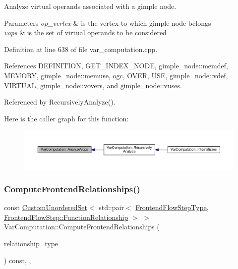 Analyze virtual operands associated with a gimple node. 


\begin{DoxyParams}{Parameters}
{\em op\+\_\+vertex} & is the vertex to which gimple node belongs \\
\hline
{\em vops} & is the set of virtual operands to be considered \\
\hline
\end{DoxyParams}


Definition at line 638 of file var\+\_\+computation.\+cpp.



References D\+E\+F\+I\+N\+I\+T\+I\+ON, G\+E\+T\+\_\+\+I\+N\+D\+E\+X\+\_\+\+N\+O\+DE, gimple\+\_\+node\+::memdef, M\+E\+M\+O\+RY, gimple\+\_\+node\+::memuse, ogc, O\+V\+ER, U\+SE, gimple\+\_\+node\+::vdef, V\+I\+R\+T\+U\+AL, gimple\+\_\+node\+::vovers, and gimple\+\_\+node\+::vuses.



Referenced by Recursively\+Analyze().

Here is the caller graph for this function\+:
\nopagebreak
\begin{figure}[H]
\begin{center}
\leavevmode
\includegraphics[width=350pt]{dd/d82/classVarComputation_ad1023a1abf7c16ada56d21c0385a54be_icgraph}
\end{center}
\end{figure}
\mbox{\label{classVarComputation_abbb72405583e939427e62d78175ac7e3}} 
\subsubsection{\texorpdfstring{Compute\+Frontend\+Relationships()}{ComputeFrontendRelationships()}}
{\footnotesize\ttfamily const \hyperlink{classCustomUnorderedSet}{Custom\+Unordered\+Set}$<$ std\+::pair$<$ \hyperlink{frontend__flow__step_8hpp_afeb3716c693d2b2e4ed3e6d04c3b63bb}{Frontend\+Flow\+Step\+Type}, \hyperlink{classFrontendFlowStep_af7cf30f2023e5b99e637dc2058289ab0}{Frontend\+Flow\+Step\+::\+Function\+Relationship} $>$ $>$ Var\+Computation\+::\+Compute\+Frontend\+Relationships (\begin{DoxyParamCaption}\item[{const \hyperlink{classDesignFlowStep_a723a3baf19ff2ceb77bc13e099d0b1b7}{Design\+Flow\+Step\+::\+Relationship\+Type}}]{relationship\+\_\+type }\end{DoxyParamCaption}) const\hspace{0.3cm}{\ttfamily [override]}, {\ttfamily [private]}, {\ttfamily [virtual]}}



